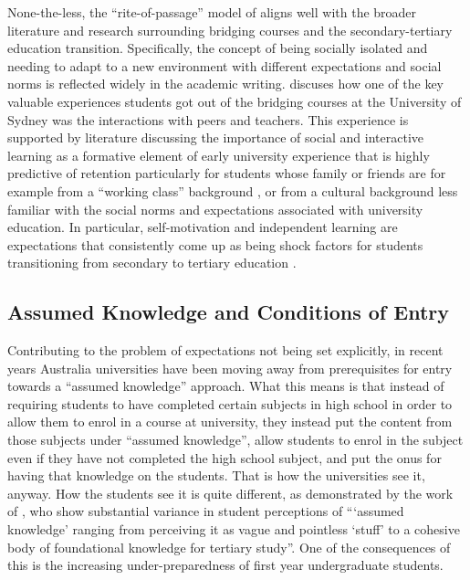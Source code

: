 \documentclass[twoside,12pt,a4paper]{report}
\begin{document}
None-the-less, the ``rite-of-passage'' model of  aligns well with the broader literature and research surrounding bridging courses and the secondary-tertiary education transition. Specifically, the concept of being socially isolated and needing to adapt to a new environment with different expectations and social norms is reflected widely in the academic writing.  discuses how one of the key valuable experiences students got out of the bridging courses at the University of Sydney was the interactions with peers and teachers. This experience is supported by literature discussing the importance of social and interactive learning as a formative element of early university experience that is highly predictive of retention \cite{Peat2001, Trotter2006} particularly for students whose family or friends are for example from a ``working class'' background \cite{Leese2010}, or from a cultural background less familiar with the social norms and expectations associated with university education. In particular, self-motivation and independent learning are expectations that consistently come up as being shock factors for students transitioning from secondary to tertiary education \cite{Murtagh2010}.


\subsection*{Assumed Knowledge and Conditions of Entry}

Contributing to the problem of expectations not being set explicitly, in recent years Australia universities have been moving away from prerequisites for entry towards a ``assumed knowledge'' approach. What this means is that instead of requiring students to have completed certain subjects in high school in order to allow them to enrol in a course at university, they instead put the content from those subjects under ``assumed knowledge'', allow students to enrol in the subject even if they have not completed the high school subject, and put the onus for having that knowledge on the students. That is how the universities see it, anyway. How the students see it is quite different, as demonstrated by the work of , who show substantial variance in student perceptions of ```assumed knowledge' ranging from perceiving it as vague and pointless `stuff' to a cohesive body of foundational knowledge for tertiary study''. One of the consequences of this is the increasing under-preparedness of first year undergraduate students.
\end{document}
